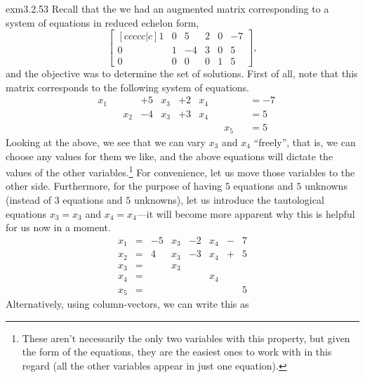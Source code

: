 \begin{exm}{}{exm3.2.53}
	Recall that the we had an augmented matrix corresponding to a system of equations in reduced echelon form,
	\begin{equation}
		\begin{bmatrix}[c c c c c | c]
		1 & 0 & 5 & 2 & 0 & -7 \\ 0 & 1 & -4 & 3 & 0 & 5 \\ 0 & 0 & 0 & 0 & 1 & 5
		\end{bmatrix},
	\end{equation}
	and the objective was to determine the set of solutions.  First of all, note that this matrix corresponds to the following system of equations.
	\begin{subequations}
		\begin{align}
			&x_1 & & & +5&x_3 & +2&x_4 & & & &=-7 \\
			& & &x_2 & -4&x_3 & +3&x_4 & & & &=5 \\
			& & & & & & & & & x_5 & &=5
		\end{align}
	\end{subequations}
	Looking at the above, we see that we can vary $x_3$ and $x_4$ ``freely'', that is, we can choose any values for them we like, and the above equations will dictate the values of the other variables.\footnote{These aren't necessarily the only two variables with this property, but given the form of the equations, they are the easiest ones to work with in this regard (all the other variables appear in just one equation).}  For convenience, let us move those variables to the other side.  Furthermore, for the purpose of having $5$ equations and $5$ unknowns (instead of $3$ equations and $5$ unknowns), let us introduce the tautological equations $x_3=x_3$ and $x_4=x_4$---it will become more apparent why this is helpful for us now in a moment.
	\begin{subequations}
		\begin{align}
			x_1&= & -5&x_3 & -2&x_4 & -&7 \\
			x_2&= & 4&x_3 & -3&x_4 & +&5 \\
			x_3&= & &x_3 & & & & \\
			x_4&= & & & &x_4 & &\\
			x_5&= & & & & & &5
		\end{align}
	\end{subequations}
	Alternatively, using column-vectors, we can write this as
	\begin{equation}\label{eqn3.2.57}

\end{equation}
\end{exm}
